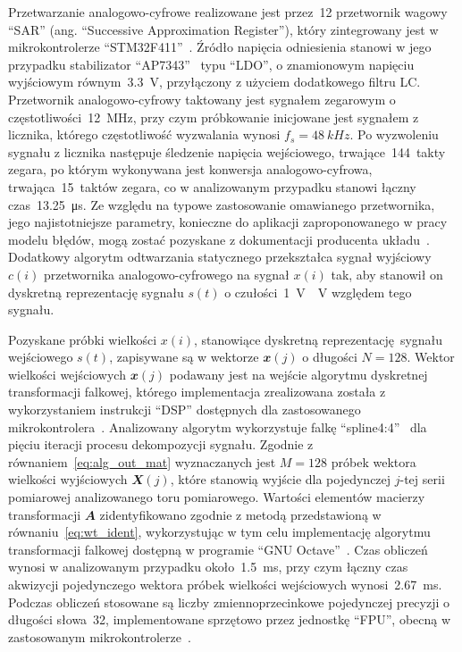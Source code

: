 Przetwarzanie analogowo-cyfrowe realizowane jest przez~\qty{12}{\bitOwy} przetwornik wagowy \enquote{SAR} (ang. \enquote{Successive Approximation Register}), który zintegrowany jest w mikrokontrolerze \enquote{STM32F411}~\cite{stm_f411}. Źródło napięcia odniesienia stanowi w jego przypadku stabilizator \enquote{AP7343}~\cite{diodes_manual} typu \enquote{LDO}, o znamionowym napięciu wyjściowym równym~\qty{3.3}{V}, przyłączony z użyciem dodatkowego filtru LC. Przetwornik analogowo-cyfrowy taktowany jest sygnałem zegarowym o częstotliwości~\qty{12}{MHz}, przy czym próbkowanie inicjowane jest sygnałem z licznika, którego częstotliwość wyzwalania wynosi $f_{s} = \qty{48}{kHz}$. Po wyzwoleniu sygnału z licznika następuje śledzenie napięcia wejściowego, trwające~\qty{144}{takty} zegara, po którym wykonywana jest konwersja analogowo-cyfrowa, trwająca~\qty{15}{taktów} zegara, co w analizowanym przypadku stanowi łączny czas~\qty{13.25}{\micro s}. Ze względu na typowe zastosowanie omawianego przetwornika, jego najistotniejsze parametry, konieczne do aplikacji zaproponowanego w pracy modelu błędów, mogą zostać pozyskane z dokumentacji producenta układu~\cite{stm_f411}. Dodatkowy algorytm odtwarzania statycznego przekształca sygnał wyjściowy $c(i)$ przetwornika analogowo-cyfrowego na sygnał $x(i)$ tak, aby stanowił on dyskretną reprezentację sygnału $s(t)$ o czułości~\qty{1}{V \per V} względem tego sygnału.

Pozyskane próbki wielkości $x(i)$, stanowiące dyskretną reprezentację sygnału wejściowego $s(t)$, zapisywane są w wektorze $\mathbfit{x}(j)$ o długości $N = 128$. Wektor wielkości wejściowych $\mathbfit{x}(j)$ podawany jest na wejście algorytmu dyskretnej transformacji falkowej, którego implementacja zrealizowana została z wykorzystaniem instrukcji \enquote{DSP} dostępnych dla zastosowanego mikrokontrolera~\cite{cortex_dsp, reay_dsp}. Analizowany algorytm wykorzystuje falkę \enquote{spline4:4}~\cite{wang_splinebasics} dla pięciu iteracji procesu dekompozycji sygnału. Zgodnie z równaniem~\eqref{eq:alg_out_mat} wyznaczanych jest $M = 128$ próbek wektora wielkości wyjściowych $\mathbfit{X}(j)$, które stanowią wyjście dla pojedynczej $j$-tej serii pomiarowej analizowanego toru pomiarowego. Wartości elementów macierzy transformacji $\mathbfit{A}$ zidentyfikowano zgodnie z metodą przedstawioną w równaniu~\eqref{eq:wt_ident}, wykorzystując w tym celu implementację algorytmu transformacji falkowej dostępną w programie \enquote{GNU Octave}~\cite{pruuvsa_dwt}. Czas obliczeń wynosi w analizowanym przypadku około~\qty{1.5}{ms}, przy czym łączny czas akwizycji pojedynczego wektora próbek wielkości wejściowych wynosi~\qty{2.67}{ms}. Podczas obliczeń stosowane są liczby zmiennoprzecinkowe pojedynczej precyzji o długości słowa~\qty{32}{\bitOw}, implementowane sprzętowo przez jednostkę \enquote{FPU}, obecną w zastosowanym mikrokontrolerze~\cite{cortex_fpu, gcc_manual}.


